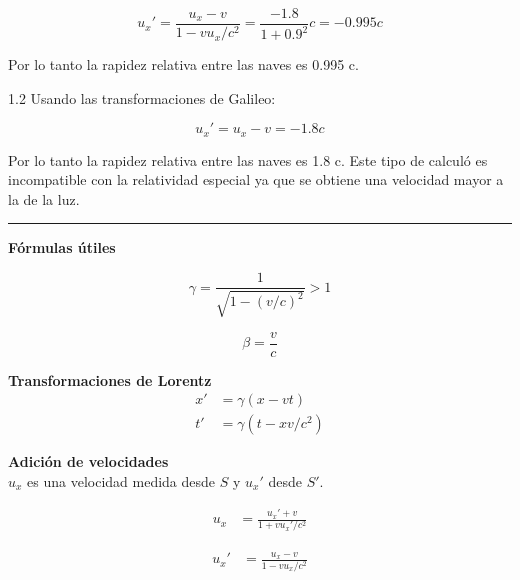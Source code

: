 \documentclass[12pt]{article}
\begin{document}
\begin{equation}
u_x' =\frac{u_x- v}{1-vu_x/c^2} = \frac{-1.8}{1+0.9^2} c = -0.995 c
\end{equation}

Por lo tanto la rapidez relativa entre las naves es 0.995 c. 

1.2 Usando las transformaciones de Galileo:


\begin{equation}
u_x' = u_x - v = -1.8 c
\end{equation}

Por lo tanto la rapidez relativa entre las naves es 1.8 c. Este tipo de calculó es incompatible con la relatividad especial ya que se obtiene una velocidad mayor a la de la luz.  

\noindent\rule{16.5cm}{0.4pt}
\pagebreak

\textbf{Fórmulas útiles}

\begin{equation*}
\gamma = \frac{1}{\sqrt{1-(v/c)^2}} > 1
\end{equation*}
 
\begin{equation*}
\beta = \frac{v}{c}
\end{equation*}

 

\textbf{Transformaciones de Lorentz}\\



\begin{align*}
 x' &= \gamma\left(x - vt\right)\\
 t' &= \gamma\left(t - xv/c^2\right)
\end{align*}



\textbf{Adición de velocidades}\\
$u_x$ es una velocidad medida desde $S$ y $u_x'$ desde $S'$. 

\begin{align*}
u_x &= \frac{u_x'+v}{1+vu_x'/c^2}
\end{align*}

\begin{align*}
u_x' &= \frac{u_x- v}{1-vu_x/c^2}
\end{align*}
\end{document}
